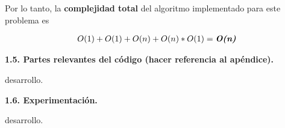 Por lo tanto, la \textbf{complejidad total} del algoritmo implementado para este problema es

\begin{align*}
  O(1) + O(1) + O(n) + O(n)*O(1) = \textit{\textbf{O(n)}}
\end{align*}



\vspace*{0.75cm} \noindent



\noindent
\textbf{1.5. Partes relevantes del código (hacer referencia al apéndice).}

\vspace*{0.3cm}

desarrollo.


\vspace*{0.75cm} \noindent



\noindent
\textbf{1.6. Experimentación.}

\vspace*{0.3cm}

desarrollo.
